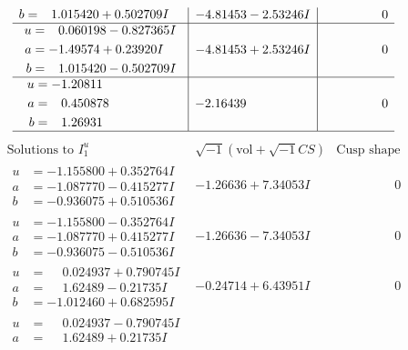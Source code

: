 \documentclass[1p]{elsarticle_modified}
\theoremstyle{definition}
\newcommand{\I}{\sqrt{-1}}
\begin{document}
$$\begin{array}{c|c|c}
\begin{aligned}
b &= \phantom{-}1.015420 + 0.502709 I\end{aligned}
 & -4.81453 - 2.53246 I & \phantom{-0.000000 } 0 \\ \hline\begin{aligned}
u &= \phantom{-}0.060198 - 0.827365 I \\
a &= -1.49574 + 0.23920 I \\
b &= \phantom{-}1.015420 - 0.502709 I\end{aligned}
 & -4.81453 + 2.53246 I & \phantom{-0.000000 } 0 \\ \hline\begin{aligned}
u &= -1.20811\phantom{ +0.000000I} \\
a &= \phantom{-}0.450878\phantom{ +0.000000I} \\
b &= \phantom{-}1.26931\phantom{ +0.000000I}\end{aligned}
 & -2.16439\phantom{ +0.000000I} & \phantom{-0.000000 } 0\\
 \hline 
 \end{array}$$\newpage$$\begin{array}{c|c|c}  
\text{Solutions to }I^u_{1}& \I (\text{vol} + \sqrt{-1}CS) & \text{Cusp shape}\\
 \hline 
\begin{aligned}
u &= -1.155800 + 0.352764 I \\
a &= -1.087770 - 0.415277 I \\
b &= -0.936075 + 0.510536 I\end{aligned}
 & -1.26636 + 7.34053 I & \phantom{-0.000000 } 0 \\ \hline\begin{aligned}
u &= -1.155800 - 0.352764 I \\
a &= -1.087770 + 0.415277 I \\
b &= -0.936075 - 0.510536 I\end{aligned}
 & -1.26636 - 7.34053 I & \phantom{-0.000000 } 0 \\ \hline\begin{aligned}
u &= \phantom{-}0.024937 + 0.790745 I \\
a &= \phantom{-}1.62489 - 0.21735 I \\
b &= -1.012460 + 0.682595 I\end{aligned}
 & -0.24714 + 6.43951 I & \phantom{-0.000000 } 0 \\ \hline\begin{aligned}
u &= \phantom{-}0.024937 - 0.790745 I \\
a &= \phantom{-}1.62489 + 0.21735 I \\

\end{aligned}
\end{array}$$
\end{document}
